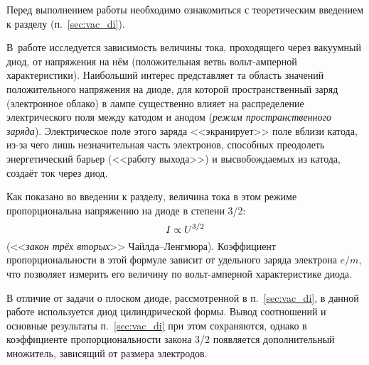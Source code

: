 


Перед выполнением работы необходимо ознакомиться с теоретическим введением
к разделу (п.~\ref{sec:vac_di}).

В~работе исследуется зависимость величины тока, проходящего через вакуумный диод,
от напряжения на нём (положительная ветвь вольт-амперной характеристики).
Наибольший интерес представляет та область значений положительного напряжения
на диоде, для которой пространственный заряд (электронное облако) в лампе 
существенно влияет на распределение электрического поля между катодом и анодом
(\emph{режим пространственного заряда}). Электрическое поле этого заряда
<<экранирует>> поле вблизи катода, из-за чего лишь незначительная часть электронов, 
способных преодолеть энергетический барьер (<<работу выхода>>) и высвобождаемых 
из катода, создаёт ток через диод.


Как показано во введении к разделу, величина 
тока в этом режиме пропорциональна напряжению на диоде в степени 3/2:
\begin{equation}
\eqmark{IU}
	I\propto U^{3/2}
\end{equation}
(<<\emph{закон трёх вторых}>> Чайлда--Ленгмюра). 
Коэффициент пропорциональности в этой формуле зависит
от удельного заряда электрона $e/m$, что позволяет измерить его величину
по вольт-амперной характеристике диода.

В отличие от задачи о плоском диоде, рассмотренной в п.~\ref{sec:vac_di},
в данной работе используется диод цилиндрической формы.
Вывод соотношений и основные результаты п.~\ref{sec:vac_di} при этом 
сохраняются, 
однако в коэффициенте пропорциональности закона 3/2 появляется
дополнительный множитель, зависящий от размера электродов.


